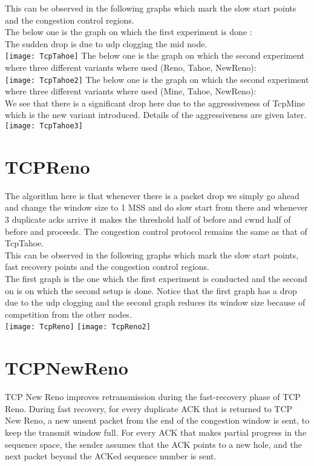 \documentclass[solution,addpoints,12pt]{exam}
\begin{document}
This can be observed in the following graphs which mark
the slow start points and the congestion control regions.\\
\newpage
The below one is the graph on which the first experiment is
done :\\
The sudden drop is due to udp clogging the mid node.\\
\texttt{[image: TcpTahoe]}
\newpage
The below one is the graph on which the second experiment where
three different variants where used (Reno, Tahoe, NewReno):\\
\texttt{[image: TcpTahoe2]}
\newpage
The below one is the graph on which the second experiment where
three different variants where used (Mine, Tahoe, NewReno):\\
We see that there is a significant drop here due to the aggressiveness
of TcpMine which is the new variant introduced. Details of the aggressiveness
are given later.\\
\texttt{[image: TcpTahoe3]}
\newpage
\section{TCPReno}
The algorithm here is that whenever there is a packet drop
we simply go ahead and change the window size to 1 MSS
and do slow start from there and whenever 3 duplicate acks
arrive it makes the threshold half of before and cwnd half of
before and proceeds. The congestion control protocol remains
the same as that of TcpTahoe.\\
This can be observed in the following graphs which mark
the slow start points, fast recovery points and the congestion control regions.\\
The first graph is the one which the first experiment is conducted
and the second on is on which the second setup is done. Notice that
the first graph has a drop due to the udp clogging and the second graph
reduces its window size because of competition from the other nodes.\\
\newpage
\texttt{[image: TcpReno]}
\newpage
\texttt{[image: TcpReno2]}
\newpage
\section{TCPNewReno}
TCP New Reno improves retransmission during the fast-recovery phase of TCP Reno. During fast recovery, for every duplicate ACK that is returned to TCP New Reno, a new unsent packet from the end of the congestion window is sent, to keep the transmit window full. For every ACK that makes partial progress in the sequence space, the sender assumes that the ACK points to a new hole, and the next packet beyond the ACKed sequence number is sent.\\
\end{document}
